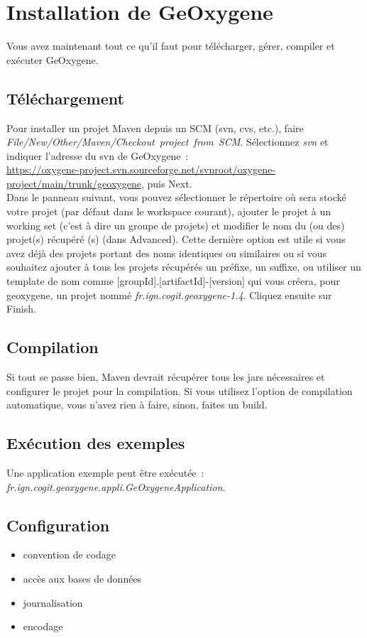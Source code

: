 \chapter{Installation de GeOxygene}


Vous avez maintenant tout ce qu'il faut pour télécharger, gérer, compiler et exécuter GeOxygene.


\section{Téléchargement}
Pour installer un projet Maven depuis un SCM (svn, cvs, etc.), faire\\
\emph{File/New/Other/Maven/Checkout~project~from~SCM}. Sélectionnez \emph{svn} et indiquer l'adresse du svn de GeOxygene~:\\
\href{https://oxygene-project.svn.sourceforge.net/svnroot/oxygene-project/main/trunk/geoxygene}{https://oxygene-project.svn.sourceforge.net/svnroot/oxygene-project/main/trunk/geoxygene}, puis Next.\\
Dans le panneau suivant, vous pouvez sélectionner le répertoire où sera stocké votre projet (par défaut dans le workspace courant), ajouter le projet à un working set (c'est à dire un groupe de projets) et modifier le nom du (ou des) projet(s) récupéré (s) (dans Advanced). Cette dernière option est utile si vous avez déjà des projets portant des noms identiques ou similaires ou si vous souhaitez ajouter à tous les projets récupérés un préfixe, un suffixe, ou utiliser un template de nom comme [groupId].[artifactId]-[version] qui vous créera, pour geoxygene, un projet nommé \emph{fr.ign.cogit.geoxygene-1.4}.
Cliquez ensuite sur Finish.


\section{Compilation}
Si tout se passe bien, Maven devrait récupérer tous les jars nécessaires et configurer le projet pour la compilation. Si vous utilisez l'option de compilation automatique, vous n'avez rien à faire, sinon, faites un build.



\section{Exécution des exemples}
Une application exemple peut \^etre exécutée~: \emph{fr.ign.cogit.geoxygene.appli.GeOxygeneApplication}.


\section{Configuration}

\begin{itemize}[leftmargin=* ,parsep=0cm,itemsep=0cm,topsep=0cm]
\item convention de codage
\item accès aux bases de données
\item journalisation
\item encodage
\end{itemize}
